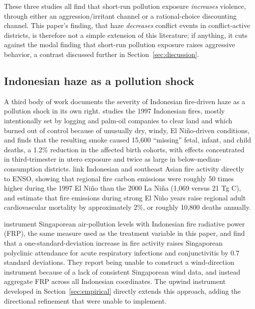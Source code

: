 \documentclass[12pt]{article}
\begin{document}
These three studies all find that short-run pollution exposure \emph{increases} violence, through either an aggression/irritant channel or a rational-choice discounting channel. This paper's finding, that haze \emph{decreases} conflict events in conflict-active districts, is therefore not a simple extension of this literature; if anything, it cuts against the modal finding that short-run pollution exposure raises aggressive behavior, a contrast discussed further in Section~\ref{sec:discussion}.

\subsection{Indonesian haze as a pollution shock}

A third body of work documents the severity of Indonesian fire-driven haze as a pollution shock in its own right. \citet{jayachandran2009} studies the 1997 Indonesian fires, mostly intentionally set by logging and palm-oil companies to clear land and which burned out of control because of unusually dry, windy, El Ni\~{n}o-driven conditions, and finds that the resulting smoke caused 15,600 ``missing'' fetal, infant, and child deaths, a 1.2\% reduction in the affected birth cohorts, with effects concentrated in third-trimester in utero exposure and twice as large in below-median-consumption districts. \citet{marlier2013} link Indonesian and southeast Asian fire activity directly to ENSO, showing that regional fire carbon emissions were roughly 50 times higher during the 1997 El Ni\~{n}o than the 2000 La Ni\~{n}a (1,069 versus 21 Tg C), and estimate that fire emissions during strong El Ni\~{n}o years raise regional adult cardiovascular mortality by approximately 2\%, or roughly 10,800 deaths annually.

\citet{sheldonsankaran2017} instrument Singaporean air-pollution levels with Indonesian fire radiative power (FRP), the same measure used as the treatment variable in this paper, and find that a one-standard-deviation increase in fire activity raises Singaporean polyclinic attendance for acute respiratory infections and conjunctivitis by 0.7 standard deviations. They report being unable to construct a wind-direction instrument because of a lack of consistent Singaporean wind data, and instead aggregate FRP across all Indonesian coordinates. The upwind instrument developed in Section~\ref{sec:empirical} directly extends this approach, adding the directional refinement that \citet{sheldonsankaran2017} were unable to implement.
\end{document}
